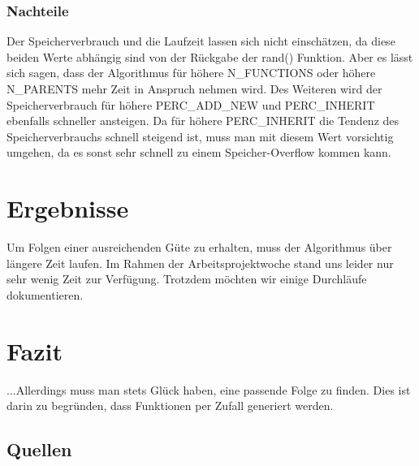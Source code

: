 \documentclass[a4paper,12pt]{article}
\begin{document}
\subsubsection{Nachteile}
Der Speicherverbrauch und die Laufzeit lassen sich nicht einschätzen, da diese beiden Werte abhängig sind von der Rückgabe der rand() Funktion. Aber es lässt sich sagen, dass der Algorithmus für höhere N\_FUNCTIONS oder höhere N\_PARENTS mehr Zeit in Anspruch nehmen wird. Des Weiteren wird der Speicherverbrauch für höhere PERC\_ADD\_NEW und PERC\_INHERIT ebenfalls schneller ansteigen. Da für höhere PERC\_INHERIT die Tendenz des Speicherverbrauchs schnell steigend ist, muss man mit diesem Wert vorsichtig umgehen, da es sonst sehr schnell zu einem Speicher-Overflow kommen kann. 
\newpage

\section{Ergebnisse}
Um Folgen einer ausreichenden Güte zu erhalten, muss der Algorithmus über längere Zeit laufen. Im Rahmen der Arbeitsprojektwoche stand uns leider nur sehr wenig Zeit zur Verfügung. Trotzdem möchten wir einige Durchläufe dokumentieren.\\
\newpage

\section{Fazit}
...Allerdings muss man stets Glück haben, eine passende Folge zu finden. Dies ist darin zu begründen, dass Funktionen per Zufall generiert werden. 
\newpage

\begin{appendix}
\section{Quellen}
\end{appendix}
\end{document}
